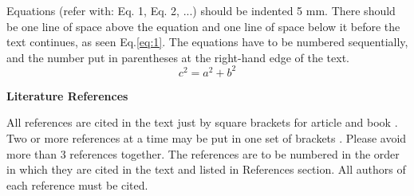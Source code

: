 \documentclass[12pt,fleqn]{article}
\begin{document}
Equations (refer with: Eq. 1, Eq. 2, ...) should be indented 5 mm. There should be one line of space above the equation and one line of space below it before the text continues, as seen Eq.\ref{eq:1}. The equations have to be numbered sequentially, and the number put in parentheses at the right-hand edge of the text. %
\begin{equation} \label{eq:1}
c^2=a^2+b^2
\end{equation}

\noindent \textbf{Literature References}

\noindent All references are cited in the text just by square brackets \cite{Star1} for article and book \cite{book}. Two or more references at a time may be put in one set of brackets \cite{chapter,website}. Please avoid more than 3 references together. The references are to be numbered in the order in which they are cited in the text and listed in References section. All authors of each reference must be cited.

 

 
\end{document}
